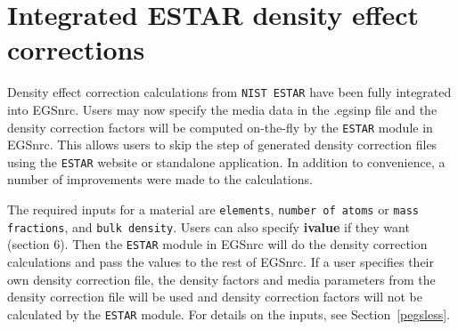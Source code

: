 
%
%
%
%
%
%
%
%
%




\section{Integrated ESTAR density effect corrections}
\label{estar}

Density effect correction calculations from {\tt NIST ESTAR} have been fully integrated into EGSnrc. Users may now specify the media data in the .egsinp file and the density correction factors will be computed on-the-fly by the {\tt ESTAR} module in EGSnrc. This allows users to skip the step of generated density correction files using the {\tt ESTAR} website or standalone application. In addition to convenience, a number of improvements were made to the calculations.

The required inputs for a material are {\tt elements}, {\tt number of atoms} or {\tt mass fractions}, and {\tt bulk density}. Users can also specify \textbf{ivalue} if they want (section 6). Then the {\tt ESTAR} module in EGSnrc will do the density correction calculations and pass the values to the rest of EGSnrc. If a user specifies their own density correction file, the density factors and media parameters from the density correction file will be used and density correction factors will not be calculated by the {\tt ESTAR} module. For details on the inputs, see Section~\ref{pegsless}.


